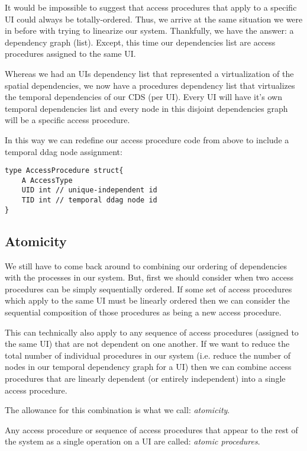 It would be impossible to suggest that access procedures that apply to a specific UI could always be totally-ordered. Thus, we arrive at the same situation we were in before with trying to linearize our system. Thankfully, we have the answer: a dependency graph (list). Except, this time our dependencies list are access procedures assigned to the same UI. 

Whereas we had an UIs dependency list that represented a virtualization of the spatial dependencies, we now have a procedures dependency list that virtualizes the temporal dependencies of our CDS (per UI). Every UI will have it's own temporal dependencies list and every node in this disjoint dependencies graph will be a specific access procedure.

In this way we can redefine our access procedure code from above to include a temporal ddag node assignment:

\begin{verbatim}
type AccessProcedure struct{
	A AccessType
	UID int // unique-independent id
	TID int // temporal ddag node id
}
\end{verbatim}

\subsection{Atomicity}

We still have to come back around to combining our ordering of dependencies with the processes in our system. But, first we should consider when two access procedures can be simply sequentially ordered. If some set of access procedures which apply to the same UI must be linearly ordered then we can consider the sequential composition of those procedures as being a new access procedure.

This can technically also apply to any sequence of access procedures (assigned to the same UI) that are not dependent on one another. If we want to reduce the total number of individual procedures in our system (i.e. reduce the number of nodes in our temporal dependency graph for a UI) then we can combine access procedures that are linearly dependent (or entirely independent) into a single access procedure.

The allowance for this combination is what we call: \textit{atomicity}.

\begin{con-def}
	\label{atomic-procedures}
	Any access procedure or sequence of access procedures that appear to the rest of the system as a single operation on a UI are called: \textit{atomic procedures}.
\end{con-def}

